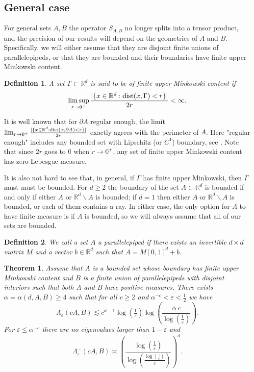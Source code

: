 \documentclass[12pt]{amsart}
\numberwithin{equation}{section}
\newcommand{\R}{\mathbb{R}}
\newcommand{\eps}{\varepsilon}
\newtheorem{theorem}[Thm]{Theorem}
\newtheorem{definition}{Definition}
\begin{document}
\subsection{General case}
For general sets $A,B$ the operator $S_{A,B}$ no longer splits into a tensor product, and the precision of our results will depend on the geometries of $A$ and $B$.  Specifically, we will either assume that they are disjoint finite unions of parallelepipeds, or that they are bounded and their boundaries have finite upper Minkowski content.
\begin{definition}
A set $\Gamma \subset \R^d$ is said to be of finite upper Minkowski content if
$$\limsup_{r\to 0^+} \frac{|\{x\in\R^d: {\rm{dist}} (x, \Gamma) < r\}|}{2r} < \infty.$$
\end{definition}
It is well known that for $\partial A$ regular enough, the limit $ \lim_{r\to 0^+} \frac{|\{x\in\R^d: {\rm{dist}} (x, \partial A) < r\}|}{2r}$ exactly agrees with the perimeter of $A$. Here "regular enough" includes any bounded set with Lipschitz (or $C^1$) boundary, see \cite[Theorem 2.106]{Ambrosio_00}. Note that since $2r$ goes to $0$ when $r\to 0^+$, any set of finite upper Minkowski content has zero Lebesgue measure. %

It is also not hard to see that, in general, if $\Gamma$ has finite upper Minkowski, then $\Gamma$ must must be bounded. For $d\ge 2$ the boundary of the set $A\subset\R^d$ is bounded if and only if either $A$ or $\R^d\backslash A$ is bounded; if $d = 1$ then either $A$ or $\R^d\backslash A$ is bounded, or each of them contains a ray. In either case, the only option for $A$ to have finite measure is if $A$ is bounded, so we will always assume that all of our sets are bounded.

\begin{definition}
We call a set $A$ a parallelepiped if there exists an invertible $d\times d$ matrix $M$ and a vector $b\in \R^d$ such that $A = M[0,1]^d + b$.
\end{definition}
\begin{theorem}\label{union and good}
Assume that $A$ is a bounded set whose boundary has finite upper Minkowski content and $B$ is a finite union of parallelepipeds with disjoint interiors such that both $A$ and $B$ have positive measures. There exists $\alpha =\alpha(d,A,B)\ge 4$ such that for all $c\ge 2$ and $\alpha^{-c} < \eps < \frac{1}{2}$ we have
\begin{equation}\label{eps not tiny}
\Lambda_\eps(cA, B) \lesssim c^{d-1} \log(\tfrac{1}{\eps}) \log\left(\frac{\alpha \, c}{\log\left(\tfrac{1}{\eps}\right)}\right).
\end{equation}
For $\eps \le \alpha^{-c}$ there are no eigenvalues larger than $1-\eps$ and
\begin{equation}\label{eps tiny}
\Lambda^{-}_\eps(cA, B)\asymp \left( \frac{\log(\tfrac{1}{\eps})}{\log \left(\tfrac{\log\left(\frac{1}{\eps}\right)}{c}\right)}\right)^d.
\end{equation}
\end{theorem}
\end{document}
